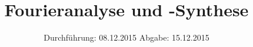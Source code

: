 

\subject{V351}
\title{Fourieranalyse und -Synthese}
\date{
  Durchführung: 08.12.2015
  \hspace{3em}
  Abgabe: 15.12.2015
}



\maketitle
\thispagestyle{empty}
\tableofcontents
\newpage







\printbibliography



